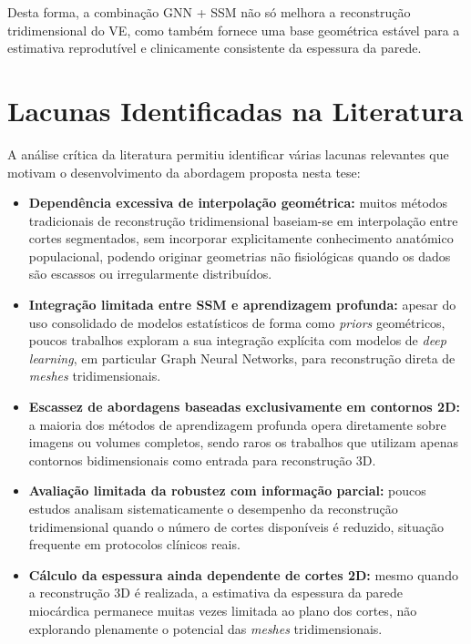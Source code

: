 \documentclass[12pt,a4paper]{report}
\begin{document}
Desta forma, a combinação GNN + SSM não só melhora a reconstrução tridimensional do VE, como também fornece uma base geométrica estável para a estimativa reprodutível e clinicamente consistente da espessura da parede. \parencite{bai-2015,demarvao2014}


\section{Lacunas Identificadas na Literatura}

A análise crítica da literatura permitiu identificar várias lacunas relevantes que motivam o desenvolvimento da abordagem proposta nesta tese:

\begin{itemize}
    \item \textbf{Dependência excessiva de interpolação geométrica:} muitos métodos tradicionais de reconstrução tridimensional baseiam-se em interpolação entre cortes segmentados, sem incorporar explicitamente conhecimento anatómico populacional, podendo originar geometrias não fisiológicas quando os dados são escassos ou irregularmente distribuídos.
    
    \item \textbf{Integração limitada entre SSM e aprendizagem profunda:} apesar do uso consolidado de modelos estatísticos de forma como \textit{priors} geométricos, poucos trabalhos exploram a sua integração explícita com modelos de \textit{deep learning}, em particular Graph Neural Networks, para reconstrução direta de \textit{meshes} tridimensionais.
    
    \item \textbf{Escassez de abordagens baseadas exclusivamente em contornos 2D:} a maioria dos métodos de aprendizagem profunda opera diretamente sobre imagens ou volumes completos, sendo raros os trabalhos que utilizam apenas contornos bidimensionais como entrada para reconstrução 3D.
    
    \item \textbf{Avaliação limitada da robustez com informação parcial:} poucos estudos analisam sistematicamente o desempenho da reconstrução tridimensional quando o número de cortes disponíveis é reduzido, situação frequente em protocolos clínicos reais.
    
    \item \textbf{Cálculo da espessura ainda dependente de cortes 2D:} mesmo quando a reconstrução 3D é realizada, a estimativa da espessura da parede miocárdica permanece muitas vezes limitada ao plano dos cortes, não explorando plenamente o potencial das \textit{meshes} tridimensionais.
\end{itemize}
\end{document}
